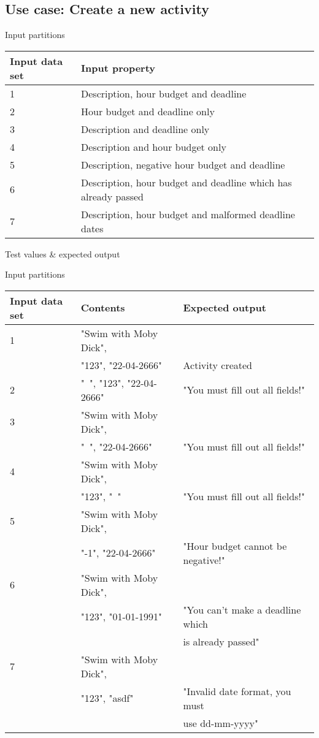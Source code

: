 \subsection{Use case: Create a new activity}

Input partitions
\begin{center}
  \begin{tabular}{| l | l |}
    \hline
	Input data set & Input property \\ \hline
    1 & Description, hour budget and deadline \\ \hline
    2 & Hour budget and deadline only \\ \hline
    3 & Description and deadline only \\ \hline
    4 & Description and hour budget only \\ \hline
    5 & Description, negative hour budget and deadline  \\ \hline
    6 & Description, hour budget and deadline which has already passed \\ \hline
    7 & Description, hour budget and malformed deadline dates \\ \hline
  \end{tabular}
\end{center}

Test values \& expected output

Input partitions
\begin{center}
  \begin{tabular}{| l | l | l |}
    \hline
	Input data set & Contents & Expected output \\ \hline
    1 & "Swim with Moby Dick", \\ & "123", "22-04-2666" & Activity created \\ \hline
    2 & "\ ", "123", "22-04-2666" & "You must fill out all fields!" \\ \hline
    3 & "Swim with Moby Dick", \\ & "\ ", "22-04-2666" & "You must fill out all fields!" \\ \hline
    4 & "Swim with Moby Dick", \\ & "123", "\ " & "You must fill out all fields!" \\ \hline
    5 & "Swim with Moby Dick", \\ & "-1", "22-04-2666" & "Hour budget cannot be negative!" \\ \hline
    6 & "Swim with Moby Dick", \\ & "123", "01-01-1991" & "You can't make a deadline which \\ && is already passed" \\ \hline
    7 & "Swim with Moby Dick", \\ & "123", "asdf" & "Invalid date format, you must \\ & & use dd-mm-yyyy" \\ \hline
  \end{tabular}
\end{center}